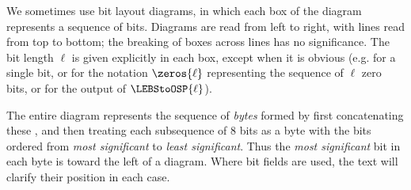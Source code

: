 

We sometimes use bit layout diagrams, in which each box of the diagram represents
a sequence of bits. Diagrams are read from left to right, with lines read from
top to bottom; the breaking of boxes across lines has no significance.
The bit length $\ell$ is given explicitly in each box, except when it is obvious
(e.g. for a single bit, or for the notation $\zeros{\ell}$ representing the sequence
of $\ell$ zero bits, or for the output of $\LEBStoOSP{\ell}$).

The entire diagram represents the sequence of \emph{bytes} formed by first
concatenating these \bitSequences, and then treating each subsequence of 8 bits
as a byte with the bits ordered from \emph{most significant} to
\emph{least significant}. Thus the \emph{most significant} bit in each byte
is toward the left of a diagram.  Where bit fields
are used, the text will clarify their position in each case.

